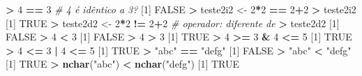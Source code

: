 \documentclass[]{book}
\newenvironment{Shaded}{\begin{snugshade}}{\end{snugshade}}
\newcommand{\KeywordTok}[1]{\textcolor[rgb]{0.13,0.29,0.53}{\textbf{#1}}}
\newcommand{\DecValTok}[1]{\textcolor[rgb]{0.00,0.00,0.81}{#1}}
\newcommand{\StringTok}[1]{\textcolor[rgb]{0.31,0.60,0.02}{#1}}
\newcommand{\CommentTok}[1]{\textcolor[rgb]{0.56,0.35,0.01}{\textit{#1}}}
\newcommand{\OtherTok}[1]{\textcolor[rgb]{0.56,0.35,0.01}{#1}}
\newcommand{\OperatorTok}[1]{\textcolor[rgb]{0.81,0.36,0.00}{\textbf{#1}}}
\newcommand{\NormalTok}[1]{#1}
\begin{document}
\begin{Shaded}
\begin{Highlighting}[]
\OperatorTok{>}\StringTok{ }\DecValTok{4} \OperatorTok{==}\StringTok{ }\DecValTok{3} \CommentTok{# 4 é idêntico a 3?}
\NormalTok{[}\DecValTok{1}\NormalTok{] }\OtherTok{FALSE}
\OperatorTok{>}\StringTok{ }\NormalTok{teste2i2 <-}\StringTok{ }\DecValTok{2}\OperatorTok{*}\DecValTok{2} \OperatorTok{==}\StringTok{ }\DecValTok{2}\OperatorTok{+}\DecValTok{2}
\OperatorTok{>}\StringTok{ }\NormalTok{teste2i2}
\NormalTok{[}\DecValTok{1}\NormalTok{] }\OtherTok{TRUE}
\OperatorTok{>}\StringTok{ }\NormalTok{teste2d2 <-}\StringTok{ }\DecValTok{2}\OperatorTok{*}\DecValTok{2} \OperatorTok{!=}\StringTok{ }\DecValTok{2}\OperatorTok{+}\DecValTok{2} \CommentTok{# operador: diferente de}
\OperatorTok{>}\StringTok{ }\NormalTok{teste2d2}
\NormalTok{[}\DecValTok{1}\NormalTok{] }\OtherTok{FALSE}
\OperatorTok{>}\StringTok{ }\DecValTok{4} \OperatorTok{<}\StringTok{ }\DecValTok{3}
\NormalTok{[}\DecValTok{1}\NormalTok{] }\OtherTok{FALSE}
\OperatorTok{>}\StringTok{ }\DecValTok{4} \OperatorTok{>}\StringTok{ }\DecValTok{3}
\NormalTok{[}\DecValTok{1}\NormalTok{] }\OtherTok{TRUE}
\OperatorTok{>}\StringTok{ }\DecValTok{4} \OperatorTok{>=}\StringTok{ }\DecValTok{3} \OperatorTok{&}\StringTok{ }\DecValTok{4} \OperatorTok{<=}\StringTok{ }\DecValTok{5}
\NormalTok{[}\DecValTok{1}\NormalTok{] }\OtherTok{TRUE}
\OperatorTok{>}\StringTok{ }\DecValTok{4} \OperatorTok{<=}\StringTok{ }\DecValTok{3} \OperatorTok{|}\StringTok{ }\DecValTok{4} \OperatorTok{<=}\StringTok{ }\DecValTok{5}
\NormalTok{[}\DecValTok{1}\NormalTok{] }\OtherTok{TRUE}
\OperatorTok{>}\StringTok{ "abc"} \OperatorTok{==}\StringTok{ "defg"}
\NormalTok{[}\DecValTok{1}\NormalTok{] }\OtherTok{FALSE}
\OperatorTok{>}\StringTok{ "abc"} \OperatorTok{<}\StringTok{ "defg"}
\NormalTok{[}\DecValTok{1}\NormalTok{] }\OtherTok{TRUE}
\OperatorTok{>}\StringTok{ }\KeywordTok{nchar}\NormalTok{(}\StringTok{"abc"}\NormalTok{) }\OperatorTok{<}\StringTok{ }\KeywordTok{nchar}\NormalTok{(}\StringTok{"defg"}\NormalTok{)}
\NormalTok{[}\DecValTok{1}\NormalTok{] }\OtherTok{TRUE}
\end{Highlighting}
\end{Shaded}
\end{document}
